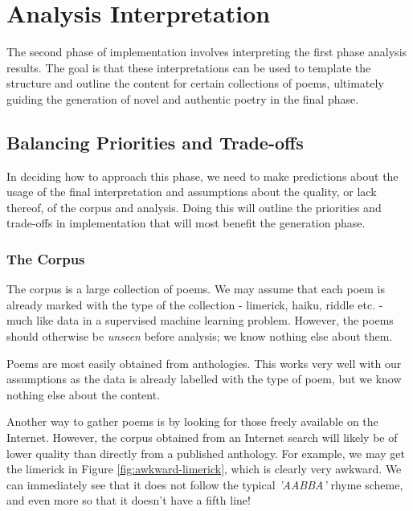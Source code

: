 \chapter{Analysis Interpretation}
\ifpdf
    \graphicspath{{Implementation/ImplementationFigs/PNG/}{Implementation/ImplementationFigs/PDF/}{Implementation/ImplementationFigs/}}
\else
    \graphicspath{{Implementation/ImplementationFigs/EPS/}{Implementation/ImplementationFigs/}}
\fi

The second phase of implementation involves interpreting the first phase analysis results. The goal is that these interpretations can be used to template the structure and outline the content for certain collections of poems, ultimately guiding the generation of novel and authentic poetry in the final phase.

\section{Balancing Priorities and Trade-offs}
\label{sec:balance-priorities}

In deciding how to approach this phase, we need to make predictions about the usage of the final interpretation and assumptions about the quality, or lack thereof, of the corpus and analysis. Doing this will outline the priorities and trade-offs in implementation that will most benefit the generation phase.


\subsection{The Corpus}

The corpus is a large collection of poems. We may assume that each poem is already marked with the type of the collection - limerick, haiku, riddle etc. - much like data in a supervised machine learning problem. However, the poems should otherwise be \textit{unseen} before analysis; we know nothing else about them. 

Poems are most easily obtained from anthologies. This works very well with our assumptions as the data is already labelled with the type of poem, but we know nothing else about the content.

Another way to gather poems is by looking for those freely available on the Internet. However, the corpus obtained from an Internet search will likely be of lower quality than directly from a published anthology. For example, we may get the limerick in Figure \ref{fig:awkward-limerick}, which is clearly very awkward. We can immediately see that it does not follow the typical \textit{'AABBA'} rhyme scheme, and even more so that it doesn't have a fifth line!

